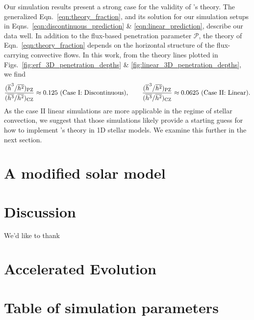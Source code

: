\documentclass{aastex631}
\newcommand{\mP}{\ensuremath{\mathcal{P}}}
\begin{document}
Our simulation results present a strong case for the validity of \citet{zahn1991}'s theory.
The generalized Eqn.~\ref{eqn:theory_fraction}, and its solution for our simulation setups in Eqns.~\ref{eqn:discontinuous_prediction} \& \ref{eqn:linear_prediction}, describe our data well.
In addition to the flux-based penetration parameter $\mP$, the theory of Eqn.~\ref{eqn:theory_fraction} depends on the horizontal structure of the flux-carrying convective flows.
In this work, from the theory lines plotted in Figs.~\ref{fig:erf_3D_penetration_depths} \& \ref{fig:linear_3D_penetration_depths}, we find
\begin{equation}
\frac{(\overline{h}^3/\overline{h^2})_{\rm{PZ}}}{(\overline{h^3}/\overline{h^2})_{\rm{CZ}}} \approx 0.125 \,\,(\text{Case I: Discontinuous}),\qquad
\frac{(\overline{h}^3/\overline{h^2})_{\rm{PZ}}}{(\overline{h^3}/\overline{h^2})_{\rm{CZ}}} \approx 0.0625 \,\,(\text{Case II: Linear}).
\end{equation}
As the case II linear simulations are more applicable in the regime of stellar convection, we suggest that those simulations likely provide a starting guess for how to implement \citet{zahn1991}'s theory in 1D stellar models.
We examine this further in the next section.











\section{A modified solar model}
\label{sec:solar_model}

\section{Discussion}
\label{sec:discussion}

\begin{acknowledgments}
We'd like to thank
\end{acknowledgments}


\appendix

\section{Accelerated Evolution}
\label{app:accelerated_evolution}
\citet{anders_etal_2018}

\section{Table of simulation parameters}
\label{app:simulation_table}







\end{document}
